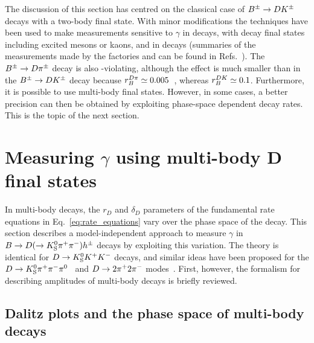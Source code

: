 The discussion of this section has centred on the classical case of ${{B}^\pm}\rightarrow D{{K}^\pm}$ decays with a two-body \D final state. With minor modifications the techniques have been used to make measurements sensitive to $\gamma$ in \Bz decays, with \B decay final states including excited \D mesons or kaons, and in \BtoDpi decays (summaries of the measurements made by the \B factories and \lhcb can be found in Refs.~\cite{BelleCombo,BabarCombo,LHCb-PAPER-2016-032,LHCb-CONF-2018-002}). The ${{B}^\pm}\rightarrow D {{\pi}^\pm}$ decay is also \CP-violating, although the effect is much smaller than in the ${{B}^\pm}\rightarrow D{{K}^\pm}$ decay because $r_B^{{D}\pi}\simeq 0.005$~\cite{rDpi}, whereas $r_B^{{D} K}\simeq 0.1$. Furthermore, it is possible to use multi-body \D final states. However, in some cases, a better precision can then be obtained by exploiting phase-space dependent decay rates. This is the topic of the next section.



\section{\texorpdfstring{Measuring $\gamma$ using multi-body D final states}{Measuring gamma using multi-body D final states}} %
\label{sec:gamma_with_multibody_d_final_states}


In multi-body \D decays, the $r_D$ and $\delta_D$ parameters of the fundamental rate equations in Eq.~\eqref{eq:rate_equations} vary over the phase space of the \D decay. This section describes a model-independent approach to measure $\gamma$ in ${B}\rightarrow{\ensuremath{D}}(\rightarrow{\ensuremath{{K}^0_{\mathrm{S}}}}{\ensuremath{{\pi}^+}}{\ensuremath{{\pi}^-}})h^\pm$ decays by exploiting this variation. The theory is identical for ${D}\rightarrow{\ensuremath{{K}^0_{\mathrm{S}}}}{\ensuremath{{K}^+}}{\ensuremath{{K}^-}}$ decays, and similar ideas have been proposed for the ${D}\rightarrow{\ensuremath{{K}^0_{\mathrm{S}}}}{\ensuremath{{\pi}^+}}{\ensuremath{{\pi}^-}}{\ensuremath{{\pi}^0}}$~\cite{evansImprovedSensitivityCKM2020} and ${D}\rightarrow2{{\pi}^+}2{{\pi}^-}$ modes~\cite{harnewModelindependentDeterminationStrong2018}. First, however, the formalism for describing amplitudes of multi-body decays is briefly reviewed.


\subsection{Dalitz plots and the phase space of multi-body decays} %
\label{sub:the_phase_space_of_multibody_decays_and_dalitz_plots}

